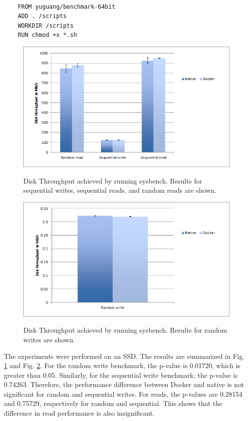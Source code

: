 \documentclass[11pt]{article}
\begin{document}
	\lstset{caption=Dockerfile for Building Benchmark Image, label=lst:dockerfile}
	\begin{lstlisting}
	
	FROM yuguang/benchmark-64bit
	ADD . /scripts
	WORKDIR /scripts
	RUN chmod +x *.sh
	\end{lstlisting}
	
	
	\begin{figure}
		\centering
		{\includegraphics[width=150mm]{disk1}}
		\caption{ Disk Throughput achieved by running sysbench.
			Results for sequential writes, sequential reads, and random reads are shown.
		}
		\label{fig:disk1}
	\end{figure}
	
	\begin{figure}
		\centering
		{\includegraphics[width=150mm]{disk2}}
		\caption{ Disk Throughput achieved by running sysbench.
			Results for random writes are shown.
		}
		\label{fig:disk2}
	\end{figure}
	
	The experiments were performed on an SSD. The results are summarized in Fig. \ref{fig:disk1} and Fig. \ref{fig:disk2}. For the random write benchmark, the p-value is 0.01720, which is greater than 0.05. Similarly, for the sequential write benchmark, the p-value is 0.74263. Therefore, the performance difference between Docker and native is not significant for random and sequential writes. For reads, the p-values are 0.28154 and 0.75729, respectively for random and sequential. This shows that the difference in read performance is also insignificant.  
	
\end{document}
